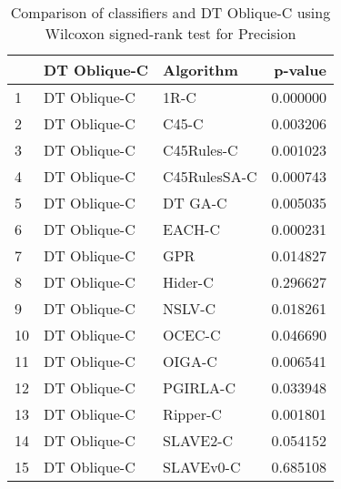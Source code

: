 \begin{table}
\footnotesize
\caption{Comparison of classifiers and DT Oblique-C using Wilcoxon signed-rank test for Precision}
\label{tab:DT Oblique-C wilcoxon Precision comparison}
\begin{tabular}{lllr}
\hline
 & DT Oblique-C & Algorithm & p-value \\
\hline
1 & DT Oblique-C & 1R-C & 0.000000 \\
2 & DT Oblique-C & C45-C & 0.003206 \\
3 & DT Oblique-C & C45Rules-C & 0.001023 \\
4 & DT Oblique-C & C45RulesSA-C & 0.000743 \\
5 & DT Oblique-C & DT GA-C & 0.005035 \\
6 & DT Oblique-C & EACH-C & 0.000231 \\
7 & DT Oblique-C & GPR & 0.014827 \\
8 & DT Oblique-C & Hider-C & 0.296627 \\
9 & DT Oblique-C & NSLV-C & 0.018261 \\
10 & DT Oblique-C & OCEC-C & 0.046690 \\
11 & DT Oblique-C & OIGA-C & 0.006541 \\
12 & DT Oblique-C & PGIRLA-C & 0.033948 \\
13 & DT Oblique-C & Ripper-C & 0.001801 \\
14 & DT Oblique-C & SLAVE2-C & 0.054152 \\
15 & DT Oblique-C & SLAVEv0-C & 0.685108 \\
\hline
\end{tabular}
\end{table}
